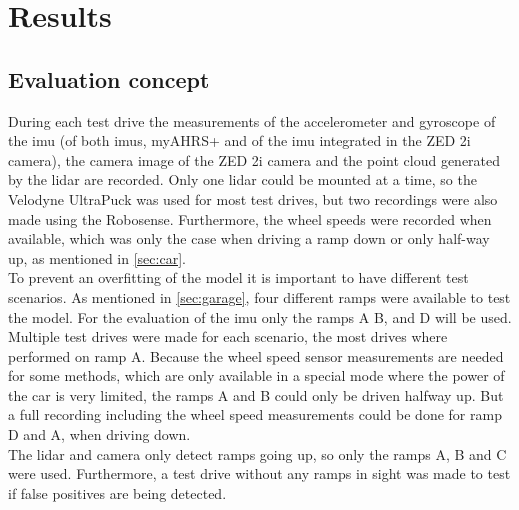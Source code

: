 \chapter{Results}
\label{ch:Results}

\section{Evaluation concept}
During each test drive the measurements of the accelerometer and gyroscope of the \gls{imu} (of both \glspl{imu}, myAHRS+ and of the \gls{imu} integrated in the ZED 2i camera), the camera image of the ZED 2i camera and the point cloud generated by the \gls{lidar} are recorded.
Only one \gls{lidar} could be mounted at a time, so the Velodyne UltraPuck was used for most test drives, but two recordings were also made using the Robosense.
Furthermore, the wheel speeds were recorded when available, which was only the case when driving a ramp down or only half-way up, as mentioned in \cref{sec:car}.\\
To prevent an overfitting of the model it is important to have different test scenarios.
As mentioned in \cref{sec:garage}, four different ramps were available to test the model.
For the evaluation of the \gls{imu} only the ramps A B, and D will be used.
Multiple test drives were made for each scenario, the most drives where performed on ramp A.
Because the wheel speed sensor measurements are needed for some methods, which are only available in a special mode where the power of the car is very limited, the ramps A and B could only be driven halfway up.
But a full recording including the wheel speed measurements could be done for ramp D and A, when driving down.\\
The \gls{lidar} and camera only detect ramps going up, so only the ramps A, B and C were used.
Furthermore, a test drive without any ramps in sight was made to test if false positives are being detected.



